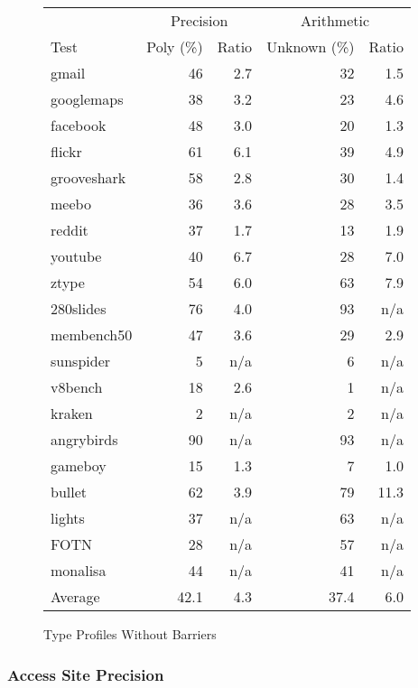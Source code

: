 \begin{figure}[ht]
\centering
\begin{tabular}{lrrrr}
\toprule
     & \multicolumn{2}{c}{Precision}
     & \multicolumn{2}{c}{Arithmetic} \\
\cmidrule(r){2-3}
\cmidrule{4-5}
Test & Poly (\%) & Ratio & Unknown (\%) & Ratio \\
\midrule
gmail          & 46 & 2.7 & 32 & 1.5 \\
googlemaps     & 38 & 3.2 & 23 & 4.6 \\
facebook       & 48 & 3.0 & 20 & 1.3 \\
flickr         & 61 & 6.1 & 39 & 4.9 \\
grooveshark    & 58 & 2.8 & 30 & 1.4 \\
meebo          & 36 & 3.6 & 28 & 3.5 \\
reddit         & 37 & 1.7 & 13 & 1.9 \\
youtube        & 40 & 6.7 & 28 & 7.0 \\
ztype          & 54 & 6.0 & 63 & 7.9 \\
280slides      & 76 & 4.0 & 93 & n/a \\
membench50     & 47 & 3.6 & 29 & 2.9 \\
\midrule
sunspider      & 5 & n/a & 6 & n/a \\
v8bench        & 18 & 2.6 & 1 & n/a \\
kraken         & 2 & n/a & 2 & n/a \\
\midrule
angrybirds     & 90 & n/a & 93 & n/a \\
gameboy        & 15 & 1.3 & 7 & 1.0 \\
bullet         & 62 & 3.9 & 79 & 11.3 \\
lights         & 37 & n/a & 63 & n/a \\
FOTN           & 28 & n/a & 57 & n/a \\
monalisa       & 44 & n/a & 41 & n/a \\
\midrule
Average        & 42.1 & 4.3 & 37.4 & 6.0 \\
\bottomrule
\end{tabular}
\nocaptionrule \caption{Type Profiles Without Barriers}
\label{fig:without_barriers}
\end{figure}

\subsubsection{Access Site Precision}
\label{sec:access_objects}

